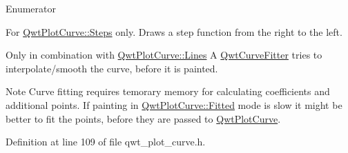\begin{Desc}
\item[Enumerator]\par
\begin{description}
\item[{\em 
\hypertarget{class_qwt_plot_curve_a38064f7de6f026a49db782c365f872c3af7790b4716576fd0641ec393f476bc46}{Inverted}\label{class_qwt_plot_curve_a38064f7de6f026a49db782c365f872c3af7790b4716576fd0641ec393f476bc46}
}]For \hyperlink{class_qwt_plot_curve_a15998aa80a11ba6ba80eebabaf773f70a18071408a0b9bfe58378c6d81e207b2c}{Qwt\-Plot\-Curve\-::\-Steps} only. Draws a step function from the right to the left. \item[{\em 
\hypertarget{class_qwt_plot_curve_a38064f7de6f026a49db782c365f872c3a583f7bc6ca4d5245fa82757f4bddea1b}{Fitted}\label{class_qwt_plot_curve_a38064f7de6f026a49db782c365f872c3a583f7bc6ca4d5245fa82757f4bddea1b}
}]Only in combination with \hyperlink{class_qwt_plot_curve_a15998aa80a11ba6ba80eebabaf773f70a8914d88bcd5f680e7091469fed67c9ba}{Qwt\-Plot\-Curve\-::\-Lines} A \hyperlink{class_qwt_curve_fitter}{Qwt\-Curve\-Fitter} tries to interpolate/smooth the curve, before it is painted.

\begin{DoxyNote}{Note}
Curve fitting requires temorary memory for calculating coefficients and additional points. If painting in \hyperlink{class_qwt_plot_curve_a38064f7de6f026a49db782c365f872c3a583f7bc6ca4d5245fa82757f4bddea1b}{Qwt\-Plot\-Curve\-::\-Fitted} mode is slow it might be better to fit the points, before they are passed to \hyperlink{class_qwt_plot_curve}{Qwt\-Plot\-Curve}. 
\end{DoxyNote}
\end{description}
\end{Desc}


Definition at line 109 of file qwt\-\_\-plot\-\_\-curve.\-h.

